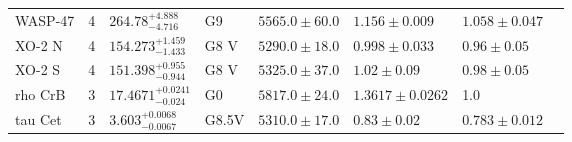 \begin{tabular}{lrllllll}
WASP-47 & 4 & $264.78^{+4.888}_{-4.716}$ & G9 & $5565.0 \pm 60.0$ & $1.156 \pm 0.009$ & $1.058 \pm 0.047$ & \cite{ADAMS_ET_AL__2021} \\
XO-2 N & 4 & $154.273^{+1.459}_{-1.433}$ & G8 V & $5290.0 \pm 18.0$ & $0.998 \pm 0.033$ & $0.96 \pm 0.05$ & \cite{RUGGIERI_ET_AL_2024} \\
XO-2 S & 4 & $151.398^{+0.955}_{-0.944}$ & G8 V & $5325.0 \pm 37.0$ & $1.02 \pm 0.09$ & $0.98 \pm 0.05$ & \cite{RUGGIERI_ET_AL_2024} \\
rho CrB & 3 & $17.4671^{+0.0241}_{-0.024}$ & G0 & $5817.0 \pm 24.0$ & $1.3617 \pm 0.0262$ & 1.0 & \cite{BREWER_ET_AL_2023} \\
tau Cet & 3 & $3.603^{+0.0068}_{-0.0067}$ & G8.5V & $5310.0 \pm 17.0$ & $0.83 \pm 0.02$ & $0.783 \pm 0.012$ & \cite{SOUSA_ET_AL__2008} \\
\bottomrule
\end{tabular}
